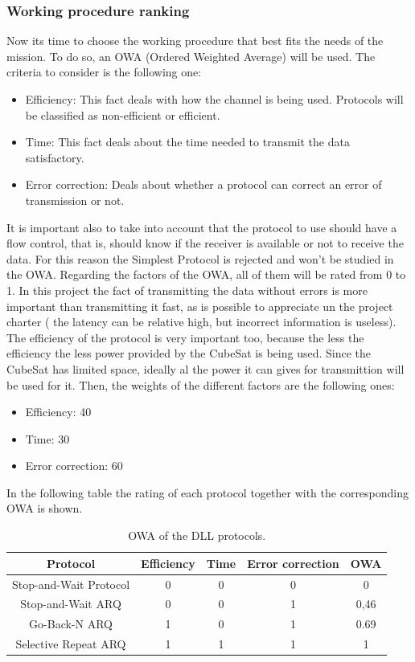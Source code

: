 \subsubsection{Working procedure ranking}
Now its time to choose the working procedure that best fits the needs of the mission. To do so, an OWA (Ordered Weighted Average) will be used. The criteria to consider is the following one:

\begin{itemize}
\item Efficiency: This fact deals with how the channel is being used. Protocols will be classified as non-efficient or efficient. 
\item Time: This fact deals about the time needed to transmit the data satisfactory.
\item Error correction: Deals about whether a protocol can correct an error of transmission or not.
\end{itemize}

It is important also to take into account that the protocol to use should have a flow control, that is, should know if the receiver is available or not to receive the data. For this reason the Simplest Protocol is rejected and won't be studied in the OWA. Regarding the factors of the OWA, all of them will be rated from 0 to 1. In this project the fact of transmitting the data without errors is more important than transmitting it fast, as is possible to appreciate un the project charter ( the latency can be relative high, but incorrect information is useless). The efficiency of the protocol is very important too, because the less the efficiency the less power provided by the CubeSat is being used. Since the CubeSat has limited space, ideally al the power it can gives for transmittion will be used for it. Then, the weights of the different factors are the following ones:

\begin{itemize}
\item Efficiency: 40
\item Time: 30
\item Error correction: 60
\end{itemize} 

In the following table the rating of each protocol together with the corresponding OWA is shown.
 
\begin{table}[H]
\begin{center}
\begin{tabular}{ | c | c | c | c | c |}
\hline
Protocol&Efficiency&Time&Error correction&OWA\\
\hline
Stop-and-Wait Protocol&0&0&0&0\\
\hline
Stop-and-Wait ARQ&0&0&1&0,46\\
\hline
Go-Back-N ARQ&1&0&1&0.69\\
\hline
Selective Repeat ARQ&1&1&1&1\\
\hline
\end{tabular}
\caption{OWA of the DLL protocols.}
\end{center}
\end{table} 

